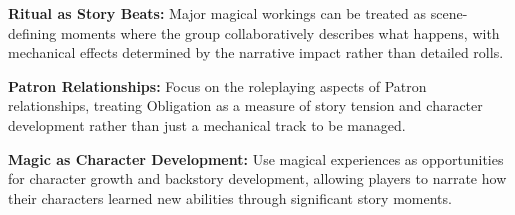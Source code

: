 \textbf{Ritual as Story Beats:} Major magical workings can be treated as scene-defining moments where the group collaboratively describes what happens, with mechanical effects determined by the narrative impact rather than detailed rolls.

\textbf{Patron Relationships:} Focus on the roleplaying aspects of Patron relationships, treating Obligation as a measure of story tension and character development rather than just a mechanical track to be managed.

\textbf{Magic as Character Development:} Use magical experiences as opportunities for character growth and backstory development, allowing players to narrate how their characters learned new abilities through significant story moments.
